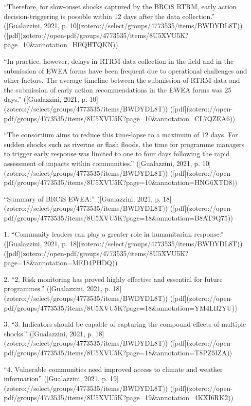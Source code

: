 {“Therefore, for slow-onset shocks captured by the BRCiS RTRM, early action decision-triggering is possible within 12 days after the data collection.” ([Gualazzini, 2021, p. 10](zotero://select/groups/4773535/items/BWDYDL8T)) ([pdf](zotero://open-pdf/groups/4773535/items/8U5XVU5K?page=10&annotation=HFQHTQKN))

“In practice, however, delays in RTRM data collection in the field and in the submission of EWEA forms have been frequent due to operational challenges and other factors. The average timeline between the submission of RTRM data and the submission of early action recommendations in the EWEA forms was 25 days.” ([Gualazzini, 2021, p. 10](zotero://select/groups/4773535/items/BWDYDL8T)) ([pdf](zotero://open-pdf/groups/4773535/items/8U5XVU5K?page=10&annotation=CL7QZEA6))

“The consortium aims to reduce this time-lapse to a maximum of 12 days. For sudden shocks such as riverine or flash floods, the time for programme managers to trigger early response was limited to one to four days following the rapid assessment of impacts within communities.” ([Gualazzini, 2021, p. 10](zotero://select/groups/4773535/items/BWDYDL8T)) ([pdf](zotero://open-pdf/groups/4773535/items/8U5XVU5K?page=10&annotation=HNG6XTD8))


“Summary of BRCiS EWEA:” ([Gualazzini, 2021, p. 18](zotero://select/groups/4773535/items/BWDYDL8T)) ([pdf](zotero://open-pdf/groups/4773535/items/8U5XVU5K?page=18&annotation=B8AT9Q75))

1. “Community leaders can play a greater role in humanitarian response.” ([Gualazzini, 2021, p. 18](zotero://select/groups/4773535/items/BWDYDL8T)) ([pdf](zotero://open-pdf/groups/4773535/items/8U5XVU5K?page=18&annotation=MED4PHDQ))

2. “2. Risk monitoring has proved highly effective and essential for future programmes.” ([Gualazzini, 2021, p. 18](zotero://select/groups/4773535/items/BWDYDL8T)) ([pdf](zotero://open-pdf/groups/4773535/items/8U5XVU5K?page=18&annotation=YM4LB2YU))


3. “3. Indicators should be capable of capturing the compound effects of multiple shocks.” ([Gualazzini, 2021, p. 18](zotero://select/groups/4773535/items/BWDYDL8T)) ([pdf](zotero://open-pdf/groups/4773535/items/8U5XVU5K?page=18&annotation=T8PZ5IZA))

“4. Vulnerable communities need improved access to climate and weather information” ([Gualazzini, 2021, p. 19](zotero://select/groups/4773535/items/BWDYDL8T)) ([pdf](zotero://open-pdf/groups/4773535/items/8U5XVU5K?page=19&annotation=4KXI6RK2))

}

